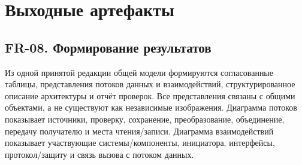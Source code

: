 \documentclass[10pt,a4paper]{article}
\begin{document}
\section{Выходные артефакты}\label{ux432ux44bux445ux43eux434ux43dux44bux435-ux430ux440ux442ux435ux444ux430ux43aux442ux44b}

\subsection{FR-08. Формирование результатов}\label{fr-08-ux444ux43eux440ux43cux438ux440ux43eux432ux430ux43dux438ux435-ux440ux435ux437ux443ux43bux44cux442ux430ux442ux43eux432}

Из одной принятой редакции общей модели формируются согласованные таблицы, представления потоков данных и взаимодействий, структурированное описание архитектуры и отчёт проверок. Все представления связаны с общими объектами, а не существуют как независимые изображения. Диаграмма потоков показывает источники, проверку, сохранение, преобразование, объединение, передачу получателю и места чтения/записи. Диаграмма взаимодействий показывает участвующие системы/компоненты, инициатора, интерфейсы, протокол/защиту и связь вызова с потоком данных.
\end{document}
